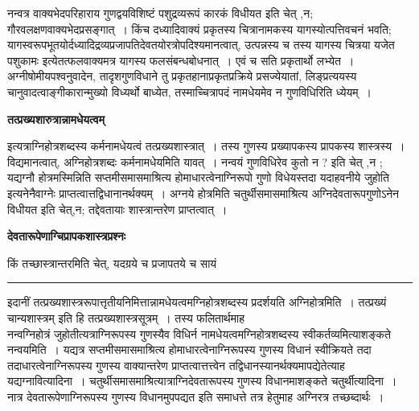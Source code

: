 \documentclass[11pt, openany]{book}
\makeatletter
\def\blfootnote{\gdef\@thefnmark{}\@footnotetext}
\makeatother
\begin{document}
 {\br नन्व}त्र वाक्यभेदपरिहाराय गुणद्वयविशिष्टं पशुद्रव्यरूपं कारकं विधीयत  इति चेत् ,{\qt न}; गौरवलक्षणवाक्यभेदप्रसङ्गात्~। किंच दध्यादिवाक्यं प्रकृतस्य 
चित्रानामकस्य यागस्योत्पत्तिवचनं भवति; यागस्वरूपभूतयोर्दध्यादिद्रव्यप्रजापतिदेवतयोरत्रोपदिश्यमानत्वात्, उत्पन्नस्य च तस्य यागस्य {\qt चित्रया यजेत पशुकामः} इत्येतत्फलवाक्यमत्र यागस्य फलसंबन्धबोधनात्~। एवं च  सति प्रकृतार्थो लभ्येत~। अग्नीषोमीयपश्वनुवादेन, तादृशगुणविधाने तु प्रकृतहानाप्रकृतप्रक्रिये प्रसज्येयातां, लिङ्प्रत्ययस्य चानुवादत्वाङ्गीकारान्मुख्यो विध्यर्थो बाध्येत, तस्माच्चित्रापदं नामधेयमेव न गुणविधिरिति ध्येयम्~।

\blfootnote{पाठा०\textemdash\ $^{१}$द्रव्यवत्त्वे चित्रा.}
\newpage
\fancyhead[LO]{[ देवतारूपेणा०प्रश्नः ]}
\begin{center}
    \textbf{तत्प्रख्यशारुत्रान्नामधेयत्वम्}
\end{center}

{ इत्यत्राग्निहोत्रशब्दस्य कर्मनामधेयत्वं  तत्प्रख्यशास्त्रात्~। तस्य गुणस्य प्रख्यापकस्य प्रापकस्य शास्त्रस्य~। विद्यमानत्वात्, अग्निहोत्रशब्दः कर्मनामधेयमिति यावत्~। नन्वयं गुणविधिरेव कुतो न ? इति चेत् ,{\qtl  न} ; यद्यग्नौ होत्रमस्मिन्निति  सप्तमीसमासमाश्रित्य होमाधारत्वेनाग्निरूपो गुणो विधेयस्तदा 
{\qtl यदाहवनीये जुहोति}  इत्यनेनैवाग्नेः प्राप्तत्वात्तद्विधानानर्थक्यम्~। अग्नये होत्रमिति चतुर्थीसमासमाश्रित्य अग्निदेवतारूपगुणोऽनेन  विधीयत इति चेत्,{\qtl न}; तद्देवतायाः शास्त्रान्तरेण प्राप्तत्वात्~।}
\begin{center}
 \textbf{देवतारूपेणाग्चिप्रापकशास्त्रप्रश्नः }   
\end{center}
 
{\bl किं तच्छास्त्रान्तरमिति चेत्, {\qtl यदग्रये च प्रजापतये च सायं}}\\
\hrule
\vspace{3mm}
\noindent
 इदानीं तत्प्रख्यशास्त्ररूपात्तृतीयनिमित्तान्नामधेयत्वमग्निहोत्रशब्दस्य प्रदर्शयति {\br अग्निहोत्रमिति~।} {\qt तत्प्रख्यं चान्यशास्त्रम्}  इति हि तत्प्रख्यशास्त्रसूत्रम्~। तस्य फलितार्थमाह \\

 {\br नन्व}ग्निहोत्रं जुहोतीत्यत्राग्निरूपस्य गुणस्यैव विधिर्न नामधेयत्वमग्निहोत्रशब्दस्य स्वीकर्तव्यमित्याशङ्कते {\br नन्वयमिति~।} यद्यत्र सप्तमीसमासमाश्रित्य 
होमाधारत्वेनाग्निरूपस्य गुणस्य विधानं स्वीक्रियते तदा तदाधारत्वेनाग्निरूपस्य  गुणस्य वाक्यान्तरेण प्राप्तत्वात्तत्त्वेन तद्विधानस्यानर्थक्यमापद्येतेत्याह\textendash
{\br यद्यग्नावित्यादिना~।} चतुर्थीसमासमाश्रित्यात्राग्निदेवतारूपस्य गुणस्य विधानमाशङ्कते {\br चतुर्थीत्यादिना~।} नात्र देवतारूपेणाग्निरूपस्य गुणस्य विधानमुपपद्यत इति समाधत्ते तत्र हेतुमाह अग्निरत्र तच्छब्दार्थः~। \\
\end{document}

